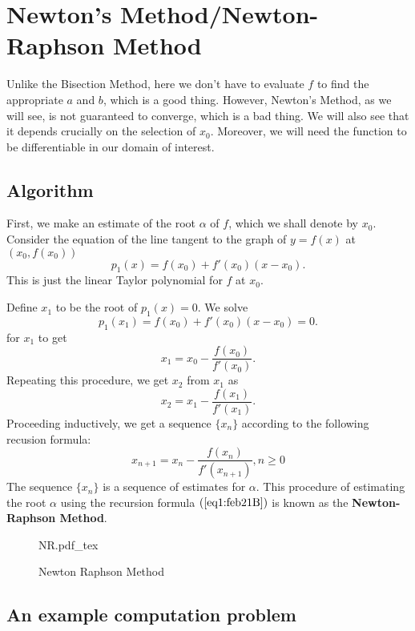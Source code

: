 
\section{Newton's Method/Newton-Raphson Method}

Unlike the Bisection Method, here we don't have to evaluate $f$ to find the appropriate  $a$ and  $b$, which is a good thing. However, Newton's Method, as we will see, is not guaranteed to converge, which is a bad thing. We will also see that it depends crucially on the selection of $x_0$. Moreover, we will need the function to be differentiable in our domain of interest.

\subsection{Algorithm}
First, we make an estimate of the root $\alpha$ of $f$, which we shall denote by  $ x_0$.
Consider the equation of the line tangent to the graph of $y = f(x)$ at $(x_0, f(x_0))$
\[
p_1(x) = f(x_0) + f'(x_0)\left( x-x_0 \right)   
.\] 
This is just the linear Taylor polynomial for $f$ at  $ x_0$.

Define $ x_1$ to be the root of $ p_1(x) = 0$. We solve 
\[
p_1(x_1) = f(x_0) + f'(x_0)(x-x_0) = 0
.\] 
for $ x_1$ to get 
\[
x_1 = x_0 - \frac{f(x_0)}{f'(x_0)}
.\] 
Repeating this procedure, we get $ x_2$ from $ x_1$ as 
\[
x_2 = x_1 - \frac{f(x_1)}{f'(x_1)}
.\] 
Proceeding inductively, we get a sequence $\{x_n\}$ according to the following recusion formula:
\begin{equation}\label{eq1:feb21B}
	 x_{n+1} = x_n - \frac{f(x_n)}{f'(x_{n+1})}, n \geq 0
\end{equation}
The sequence $\{x_n\}$ is a sequence of estimates for  $\alpha$. This procedure of estimating the root $\alpha$ using the recursion formula $\left( \ref{eq1:feb21B} \right) $ is known as the \textbf{Newton-Raphson Method}.
\newpage

\begin{figure}[H]
	\centering
	\def\svgwidth{0.8\textwidth}
	{NR.pdf_tex}
	\caption{Newton Raphson Method}
	\label{fig1:feb21B}
\end{figure}


\subsection{An example computation problem}

